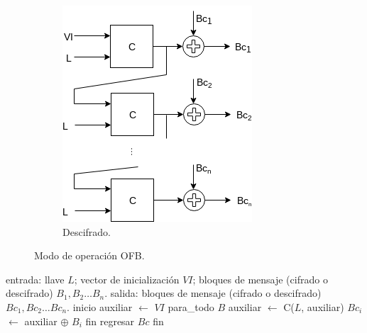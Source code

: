 \begin{figure}[H]
\begin{subfigure}{0.45\textwidth}
\begin{center}
          \includegraphics[width=0.7\linewidth]
            {contenidos/antecedentes/bloques/modos/diagramas/modo_ofb_inverso.png}
          \caption{Descifrado.}
      \end{center}
  \end{subfigure}
  \caption{Modo de operación OFB.}
\end{figure}

\begin{pseudocodigo}[caption={Modo de operación OFB (cifrado y descifrado).}]
  entrada: llave $ L $; vector de inicialización $ VI $;
           bloques de mensaje (cifrado o descifrado) $ B_1, B_2 \dots B_n $.
   salida: bloques de mensaje (cifrado o descifrado) $ Bc_1, Bc_2 \dots Bc_n $.
  inicio
    auxiliar $\gets$ $ VI $
    para_todo $B$
      auxiliar $\gets$ C($L$, auxiliar)
      $Bc_i$ $\gets$  auxiliar $\oplus$ $B_i$
    fin
    regresar $Bc$
  fin
\end{pseudocodigo}
